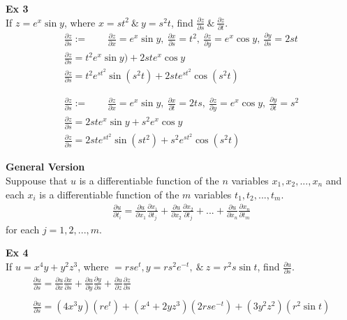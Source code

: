 \documentclass{article}
\begin{document}
  \textbf{Ex 3}\\
  If $ z=e^{x}\sin{y} $, where $ x=st^{2}  ~\&~ y=s^{2}t $, find $ \frac{\partial z}{\partial s} ~\&~ \frac{\partial z}{\partial t}  $.
  \[
    \begin{gathered}
      \frac{\partial z}{\partial s}:= \qquad \frac{\partial z}{\partial x}=e^{x}\sin{y},~\frac{\partial x}{\partial s}=t^{2},~\frac{\partial z}{\partial y}=e^{x}\cos{y},~\frac{\partial y}{\partial s}=2st\\
    \frac{\partial z}{\partial s}= t^{2} e^{x}\sin{y} )+2ste^{x}\cos{y}\\
    \boxed{\frac{\partial z}{\partial s} = t^{2}e^{st^{2}}\sin{(s^{2}t)} + 2st e^{st^{2} }\cos{(s^{2}t)}}\\
    ~\\
    ~\\
    \frac{\partial z}{\partial s} := \qquad \frac{\partial z}{\partial x}=e^{x}\sin{y},~\frac{\partial x}{\partial t}=2ts,~\frac{\partial z}{\partial y}=e^{x}\cos{y},~\frac{\partial y}{\partial t}=s^{2}\\
    \frac{\partial z}{\partial s}=2ste^{x}\sin{y}+s^{2}e^{x}\cos{y}\\
    \boxed{\frac{\partial z}{\partial s}= 2ste^{st^{2}}\sin{(st^{2})}+s^{2}e^{st^{2}}\cos{(s^{2}t)}}      
    \end{gathered}
  \]
  
  \textbf{General Version}\\
  Suppouse that $ u $ is a differentiable function of the $ n $ variables $ x_{1},x_{2},...,x_{n} $ and each $ x_{i}  $ is a differentiable function of the $ m $ variables $ t_{1},t_{2},...,t_{m} $.
  \[
      \begin{gathered}
      \frac{\partial u}{\partial t_{i} } = \frac{\partial u}{\partial x_{1} } \frac{\partial x_{1} }{\partial t_{j} }+\frac{\partial u}{\partial x_{2} }\frac{\partial x_{2}}{\partial t_{j}}+...+\frac{\partial u}{\partial x_{n} }\frac{\partial x_{n} }{\partial t_{m} }
      \end{gathered}
  \]
  for each $ j =1,2,...,m$.

  \textbf{Ex 4}\\
  If $ u=x^{4}y+y^{2}z^{3}    $, where $ =rse^{t},y=rs^{2}e^{-t}, ~\&~ z=r^{2}s\sin{t}$, find $ \frac{\partial u}{\partial s} $.
  \[
      \begin{gathered}
      \frac{\partial u}{\partial s} = \frac{\partial u}{\partial x}\frac{\partial x}{\partial s}+\frac{\partial u}{\partial y}\frac{\partial y}{\partial s}+\frac{\partial u}{\partial z}\frac{\partial z}{\partial s}\\
      ~\\
      \boxed{\frac{\partial u}{\partial s}=(4x^{3} y)(re^{t})+(x^{4}+2yz^{3} )(2rse^{-t})+(3y^{2}z^{2}  )(r^{2}\sin{t})} 
      \end{gathered}
  \]
\end{document}
